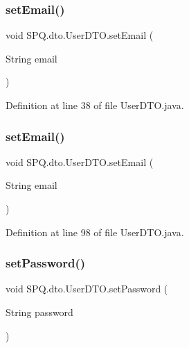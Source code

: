 \subsubsection{\texorpdfstring{set\+Email()}{setEmail()}\hspace{0.1cm}{\footnotesize\ttfamily [2/3]}}
{\footnotesize\ttfamily void S\+P\+Q.\+dto.\+User\+D\+T\+O.\+set\+Email (\begin{DoxyParamCaption}\item[{String}]{email }\end{DoxyParamCaption})}



Definition at line 38 of file User\+D\+T\+O.\+java.

\mbox{\label{class_s_p_q_1_1dto_1_1_user_d_t_o_a3e41397e229b7f0398232747d97d6d5e}} 
\subsubsection{\texorpdfstring{set\+Email()}{setEmail()}\hspace{0.1cm}{\footnotesize\ttfamily [3/3]}}
{\footnotesize\ttfamily void S\+P\+Q.\+dto.\+User\+D\+T\+O.\+set\+Email (\begin{DoxyParamCaption}\item[{String}]{email }\end{DoxyParamCaption})}



Definition at line 98 of file User\+D\+T\+O.\+java.

\mbox{\label{class_s_p_q_1_1dto_1_1_user_d_t_o_a35bd2d50e194e3d923e8adcf229e5a3e}} 
\subsubsection{\texorpdfstring{set\+Password()}{setPassword()}\hspace{0.1cm}{\footnotesize\ttfamily [1/3]}}
{\footnotesize\ttfamily void S\+P\+Q.\+dto.\+User\+D\+T\+O.\+set\+Password (\begin{DoxyParamCaption}\item[{String}]{password }\end{DoxyParamCaption})}



